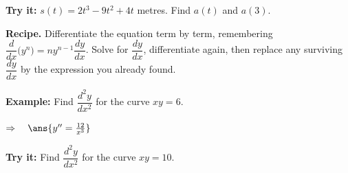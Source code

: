 \documentclass[12pt]{article}
\begin{document}
\begin{tryitbox}
\textbf{Try it:} \quad $s(t) = 2t^3 - 9t^2 + 4t$ metres. Find $a(t)$ and $a(3)$.\\[2pt]
\end{tryitbox}


\begin{formulabox}
\textbf{Recipe.} Differentiate the equation term by term, remembering
$\dfrac{d}{dx}\big(y^n\big) = ny^{n-1}\dfrac{dy}{dx}$. Solve for
$\dfrac{dy}{dx}$, differentiate again, then replace any surviving
$\dfrac{dy}{dx}$ by the expression you already found.
\end{formulabox}

\begin{examplebox}
\textbf{Example:} \quad Find $\dfrac{d^2y}{dx^2}$ for the curve $xy = 6$.

$\Rightarrow\quad \ans{y'' = \tfrac{12}{x^3}}$
\end{examplebox}

\begin{tryitbox}
\textbf{Try it:} \quad Find $\dfrac{d^2y}{dx^2}$ for the curve $xy = 10$.\\[2pt]
\end{tryitbox}
\end{document}
